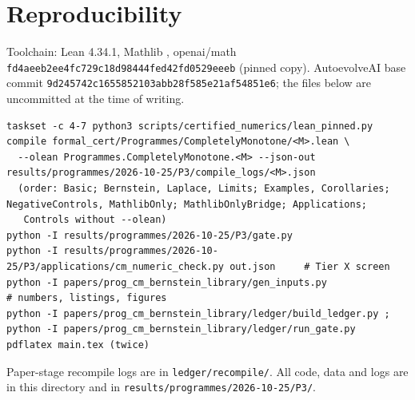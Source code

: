 \documentclass[10pt]{article}
\theoremstyle{remark}
\begin{document}
\section{Reproducibility}\label{sec:repro}
Toolchain: Lean 4.34.1, Mathlib \texttt{\PnMathlibSha}, openai/math \texttt{fd4aeeb2ee4fc729c18d98444fed42fd0529eeeb} (pinned copy).
AutoevolveAI base commit \texttt{9d245742c1655852103abb28f585e21af54851e6}; the files below are uncommitted at the time of writing.
\begin{itemize}\itemsep0pt\footnotesize

\end{itemize}
\begin{lstlisting}[basicstyle=\ttfamily\tiny]
taskset -c 4-7 python3 scripts/certified_numerics/lean_pinned.py compile formal_cert/Programmes/CompletelyMonotone/<M>.lean \
  --olean Programmes.CompletelyMonotone.<M> --json-out results/programmes/2026-10-25/P3/compile_logs/<M>.json
  (order: Basic; Bernstein, Laplace, Limits; Examples, Corollaries; NegativeControls, MathlibOnly; MathlibOnlyBridge; Applications;
   Controls without --olean)
python -I results/programmes/2026-10-25/P3/gate.py
python -I results/programmes/2026-10-25/P3/applications/cm_numeric_check.py out.json     # Tier X screen
python -I papers/prog_cm_bernstein_library/gen_inputs.py                                  # numbers, listings, figures
python -I papers/prog_cm_bernstein_library/ledger/build_ledger.py ; python -I papers/prog_cm_bernstein_library/ledger/run_gate.py
pdflatex main.tex (twice)
\end{lstlisting}
Paper-stage recompile logs are in \texttt{ledger/recompile/}. All code, data and logs are in this directory and in
\texttt{results/programmes/2026-10-25/P3/}.
\end{document}
